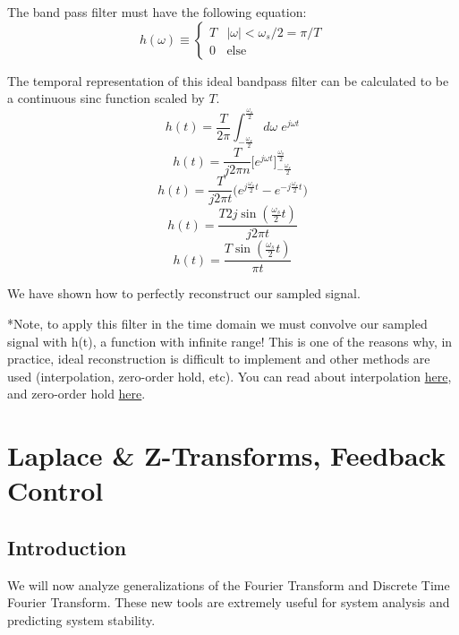 \documentclass[a4paper]{article}
\numberwithin{equation}{section}
\begin{document}
The band pass filter must have the following equation:
\begin{equation}
h(\omega) \equiv
\begin{cases} 
      T & |\omega| < \omega_s/2=\pi/T \\
      0 & \text{else}
\end{cases}
\end{equation}

The temporal representation of this ideal bandpass filter can be calculated to be a continuous sinc function scaled by $T$.
\begin{equation}
h(t)=\frac{T}{2\pi}\int_{-\frac{\omega_s}{2}}^{\frac{\omega_s}{2}}d\omega \; e^{j\omega t}
\end{equation}
\begin{equation}
h(t)=\frac{T}{j2\pi n }\big[ e^{j\omega t}\big]_{-\frac{\omega_s}{2}}^{\frac{\omega_s}{2}}
\end{equation}
\begin{equation}
h(t)=\frac{T}{j2\pi t }\big( e^{j\frac{\omega_s}{2} t}-e^{-j\frac{\omega_s}{2} t}\big)
\end{equation}
\begin{equation}
h(t)=\frac{T2j\sin{(\frac{\omega_s}{2} t)}}{j2\pi t }
\end{equation}
\begin{equation}
h(t)=\frac{T\sin{(\frac{\omega_s}{2} t)}}{\pi t }
\end{equation}

We have shown how to perfectly reconstruct our sampled signal.

*Note, to apply this filter in the time domain we must convolve our sampled signal with h(t), a function with infinite range! This is one of the reasons why, in practice, ideal reconstruction is difficult to implement and other methods are used (interpolation, zero-order hold, etc). You can read about interpolation \href{https://en.wikipedia.org/wiki/Interpolation}{here}, and zero-order hold \href{https://en.wikipedia.org/wiki/Zero-order_hold}{here}.


\section{Laplace \& Z-Transforms, Feedback Control}
\subsection{Introduction}
We will now analyze generalizations of the Fourier Transform and Discrete Time Fourier Transform. These new tools are extremely useful for system analysis and predicting system stability. 
\end{document}
